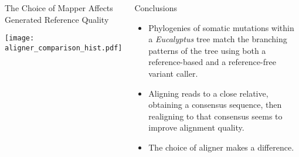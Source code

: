 \documentclass{beamer}
\begin{document}
\begin{frame}{}
\begin{columns}
\begin{block}{The Choice of Mapper Affects Generated Reference Quality}

\begin{center}

\texttt{[image: aligner\_comparison\_hist.pdf]}

\end{center}

\end{block}




\begin{block}{Conclusions}

\begin{itemize}
	\item Phylogenies of somatic mutations within a \textit{Eucalyptus} tree match the branching patterns of the tree using both a reference-based and a reference-free variant caller.
	\item Aligning reads to a close relative, obtaining a consensus sequence, then realigning to that consensus seems to improve alignment quality.
	\item The choice of aligner makes a difference.
\end{itemize}

\end{block}



\end{columns}
\end{frame}
\end{document}
